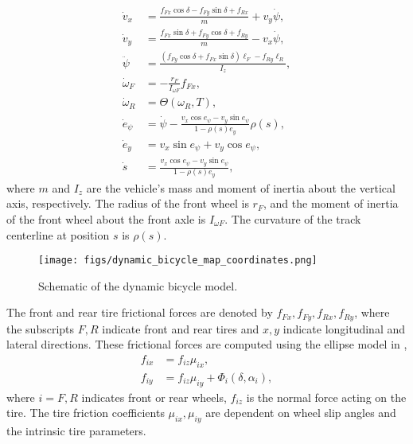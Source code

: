 \begin{subequations}\label{eqn:VehicleDynamics}
\begin{align} 
\dot{v}_{x} &= \frac{f_{F x}\cos\delta - f_{F y}\sin\delta + f_{R x}}{m} + v_{y} \dot{\psi}, \\ 
\dot{v}_{y}&= \frac{f_{F x}\sin\delta + f_{F y}\cos\delta + f_{R y}}{m} - v_x \dot{\psi}, \\ 
\ddot{\psi} &=\frac{\left(f_{F y}\cos\delta + f_{F x}\sin\delta\right) \ell_{F} - f_{R y}\ell_{R}}{I_z},\\
\dot{\omega}_F &= -\frac{r_F}{I_{\omega F}}f_{Fx},\\
\dot{\omega}_R &= \Theta(\omega_R, T), \label{eqn:rear_wheel_acceleration}\\
\dot{e}_\psi &= \dot{\psi} - \frac{v_{x} \cos{e_{\psi}} - v_{y} \sin{e_{\psi}}}{1 - \rho(s) e_{y}} \rho(s), \\
\dot{e}_y &= v_{x} \sin{e_{\psi}} + v_{y} \cos{e_{\psi}},\\
\dot{s} &= \frac{v_{x} \cos{e_{\psi}} - v_{y} \sin{e_{\psi}}}{1 - \rho(s) e_{y}},
\end{align}
\end{subequations}
where $m$ and $I_z$ are the vehicle's mass and moment of inertia about the vertical axis, respectively. The radius of the front wheel is $r_F$, and the moment of inertia of the front wheel about the front axle is $I_{\omega F}$. The curvature of the track centerline at position $s$ is $\rho(s)$.
\begin{figure}[!h]
    \centering
    \texttt{[image: figs/dynamic\_bicycle\_map\_coordinates.png]}
    \caption{Schematic of the dynamic bicycle model.}
    \label{fig:wheel_velocities}
\end{figure}
The front and rear tire frictional forces are denoted by $f_{Fx}, f_{Fy}, f_{Rx}, f_{Ry}$, where the subscripts $F, R$ indicate front and rear tires and $x, y$ indicate longitudinal and lateral directions. These frictional forces are computed using the ellipse model in \cite{velenis2010steady},
\begin{subequations}\label{egs:fric_from_normals}
\begin{align}
    f_{ix} &= f_{iz}\mu_{ix}, \\
    f_{iy} &= f_{iz}\mu_{iy} + \Phi_i(\delta, \alpha_i), \label{f_iy}
\end{align}
\end{subequations}
where $i = F, R$ indicates front or rear wheels, $f_{iz}$ is the normal force acting on the tire. The tire friction coefficients $\mu_{ix}, \mu_{iy}$ are dependent on wheel slip angles and the intrinsic tire parameters. 

